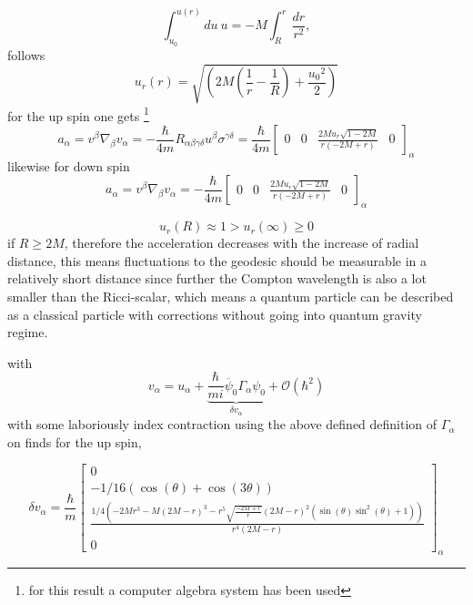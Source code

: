 \documentclass[12pt,a4paper]{article}
\begin{document}
	$$
	\int_{u_0}^{u(r)} du \ u = - M \int _R^r \frac{dr}{r^2},
	$$
	follows
	$$
	u_r(r) = \sqrt{\left(2M\left(\frac{1}{r}-\frac{1}{R}\right) + \frac{{u_0}^2}{2} \right)}
	$$
	for the up spin one gets \footnote{for this result a computer algebra system has been used}
	\begin{equation}
		a_\alpha = v^\beta \nabla_\beta v_\alpha =  -\frac{\hbar}{4m} R_{\alpha \beta \gamma \delta}u^\beta \sigma^{\gamma \delta} = \frac{\hbar}{4m} \left[\begin{matrix}0 & 0 & \frac{2 M u_{r} \sqrt{1 - 2 M}}{r \left(- 2 M + r\right)} & 0\end{matrix}\right]_\alpha
	\end{equation}
	likewise for down spin
	\begin{equation}
		a_\alpha = v^\beta \nabla_\beta v_\alpha = -\frac{\hbar}{4m} \left[\begin{matrix}0 & 0 & \frac{2 M u_{r} \sqrt{1 - 2 M}}{r \left(- 2 M + r\right)} & 0\end{matrix}\right]_\alpha
	\end{equation}
	
	$$
	u_r(R) \approx 1 > u_r(\infty) \geq 0 
	$$
	if $R\geq 2M$, 
	therefore the acceleration decreases with the increase of radial distance, this means fluctuations to the geodesic should be measurable in a relatively short distance since further the Compton wavelength is also a lot smaller than the Ricci-scalar, which means a quantum particle can be described as a classical particle with corrections without going into quantum gravity regime.
	
	with 
	\begin{equation}
		\label{correction_to_v}
		v_\alpha = u_\alpha + \underbrace{\frac{\hbar}{mi}\overbar{\psi}_0 \Gamma_\alpha \psi_0}_{\delta v_\alpha} +\mathcal{O} (\hbar^2)
	\end{equation}
	with some laboriously index contraction using the above defined definition of $\Gamma_\alpha$
	on finds for the up spin,
	
	$$
	\delta v_\alpha = \frac{\hbar}{m} \left[\begin{matrix}0\\- 1/16 \left( \cos{\left(\theta \right)} + \cos{\left(3 \theta \right)}\right)\\\frac{1/4 \left(- 2 M r^{3} - M  \left(2 M - r\right)^{3} - r^{5} \sqrt{\frac{- 2 M + r}{r}} \left(2 M - r\right)^{2} \left(\sin{\left(\theta \right)} \sin^{2}{\left(\theta \right)} + 1\right)\right)}{r^{4}  \left(2 M - r\right)}\\0\end{matrix}\right]_\alpha
	$$
	
	
	
	

	
	
	
	
	
	
	
	
	
	
	
	
	
	
	
	
	
	
	
	
	
	
	
	

	

	
	
	
	
	
	
\end{document}
